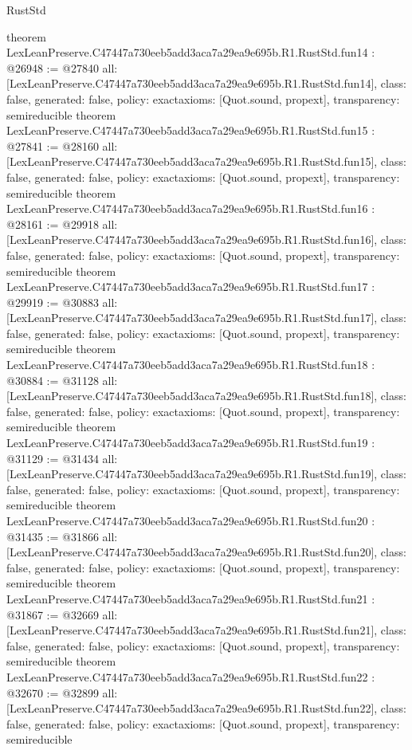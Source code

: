 \begin{lexlean}{RustStd}
\begin{coremodule}
{}
theorem LexLeanPreserve.C47447a730eeb5add3aca7a29ea9e695b.R1.RustStd.fun14 : @26948 := @27840 {
  all: [LexLeanPreserve.C47447a730eeb5add3aca7a29ea9e695b.R1.RustStd.fun14],
  class: false,
  generated: false,
  policy: exact{axioms: [Quot.sound, propext]},
  transparency: semireducible
}
theorem LexLeanPreserve.C47447a730eeb5add3aca7a29ea9e695b.R1.RustStd.fun15 : @27841 := @28160 {
  all: [LexLeanPreserve.C47447a730eeb5add3aca7a29ea9e695b.R1.RustStd.fun15],
  class: false,
  generated: false,
  policy: exact{axioms: [Quot.sound, propext]},
  transparency: semireducible
}
theorem LexLeanPreserve.C47447a730eeb5add3aca7a29ea9e695b.R1.RustStd.fun16 : @28161 := @29918 {
  all: [LexLeanPreserve.C47447a730eeb5add3aca7a29ea9e695b.R1.RustStd.fun16],
  class: false,
  generated: false,
  policy: exact{axioms: [Quot.sound, propext]},
  transparency: semireducible
}
theorem LexLeanPreserve.C47447a730eeb5add3aca7a29ea9e695b.R1.RustStd.fun17 : @29919 := @30883 {
  all: [LexLeanPreserve.C47447a730eeb5add3aca7a29ea9e695b.R1.RustStd.fun17],
  class: false,
  generated: false,
  policy: exact{axioms: [Quot.sound, propext]},
  transparency: semireducible
}
theorem LexLeanPreserve.C47447a730eeb5add3aca7a29ea9e695b.R1.RustStd.fun18 : @30884 := @31128 {
  all: [LexLeanPreserve.C47447a730eeb5add3aca7a29ea9e695b.R1.RustStd.fun18],
  class: false,
  generated: false,
  policy: exact{axioms: [Quot.sound, propext]},
  transparency: semireducible
}
theorem LexLeanPreserve.C47447a730eeb5add3aca7a29ea9e695b.R1.RustStd.fun19 : @31129 := @31434 {
  all: [LexLeanPreserve.C47447a730eeb5add3aca7a29ea9e695b.R1.RustStd.fun19],
  class: false,
  generated: false,
  policy: exact{axioms: [Quot.sound, propext]},
  transparency: semireducible
}
theorem LexLeanPreserve.C47447a730eeb5add3aca7a29ea9e695b.R1.RustStd.fun20 : @31435 := @31866 {
  all: [LexLeanPreserve.C47447a730eeb5add3aca7a29ea9e695b.R1.RustStd.fun20],
  class: false,
  generated: false,
  policy: exact{axioms: [Quot.sound, propext]},
  transparency: semireducible
}
theorem LexLeanPreserve.C47447a730eeb5add3aca7a29ea9e695b.R1.RustStd.fun21 : @31867 := @32669 {
  all: [LexLeanPreserve.C47447a730eeb5add3aca7a29ea9e695b.R1.RustStd.fun21],
  class: false,
  generated: false,
  policy: exact{axioms: [Quot.sound, propext]},
  transparency: semireducible
}
theorem LexLeanPreserve.C47447a730eeb5add3aca7a29ea9e695b.R1.RustStd.fun22 : @32670 := @32899 {
  all: [LexLeanPreserve.C47447a730eeb5add3aca7a29ea9e695b.R1.RustStd.fun22],
  class: false,
  generated: false,
  policy: exact{axioms: [Quot.sound, propext]},
  transparency: semireducible
}
\end{coremodule}
\end{lexlean}
